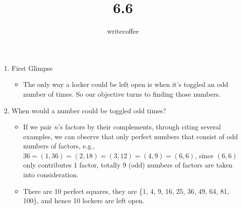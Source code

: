 \documentclass[11pt]{article}
\author{writecoffee} \title{6.6}
\begin{document}
\maketitle

{\setlength{\baselineskip}{1\baselineskip}
\setlength{\parindent}{0pt}
\setlength{\parskip}{2ex plus 0.5ex minus 0.2ex}
\begin{enumerate}[1.]
\item
	First Glimpse
	\begin{itemize}
	\item
	The only way a locker could be left open is when it's toggled an odd number of times. So our objective turns to finding those numbers.
	\end{itemize}
\item
	When would a number could be toggled odd times?
	\begin{itemize}
	\item
	If we pair $n$'s factors by their complements, through citing several examples, we can observe that only perfect numbers that 
	consist of odd numbers of factors, e.g., $36 = (1, 36) = (2, 18) = (3, 12) = (4, 9) = (6, 6)$, since $(6, 6)$ only contributes 1 %
	factor, totally 9 (odd) numbers of factors are taken into consideration.
	\item
	There are 10 perfect squares, they are \{1, 4, 9, 16, 25, 36, 49, 64, 81, 100\}, and hence 10 lockers are left open.
	\end{itemize}
\end{enumerate}
\par}
%
%
\end{document}

